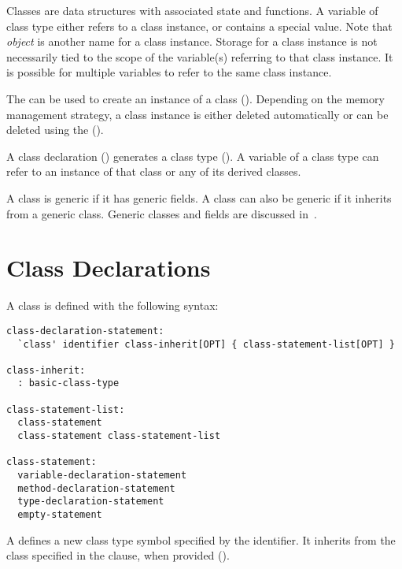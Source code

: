 \label{Classes}


Classes are data structures with associated state and functions.  A
variable of class type either refers to a class instance, or contains a
special  value. Note that \emph{object} is another name for a
class instance.  Storage for a class instance is not necessarily tied to
the scope of the variable(s) referring to that class instance. It is
possible for multiple variables to refer to the same class instance.

The  can be used to create an instance of a class
(). Depending on the memory management strategy, a class
instance is either deleted automatically or can be deleted using the
 ().

A class declaration () generates a class
type ().  A variable of a class type can refer to an
instance of that class or any of its derived classes.

A class is generic if it has generic fields. A class can also
be generic if it inherits from a generic class. Generic classes and fields
are discussed in~.

\section{Class Declarations}
\label{Class_Declarations}

A class is defined with the following syntax:
\begin{syntax}
\begin{verbatim}
class-declaration-statement:
  `class' identifier class-inherit[OPT] { class-statement-list[OPT] }

class-inherit:
  : basic-class-type

class-statement-list:
  class-statement
  class-statement class-statement-list

class-statement:
  variable-declaration-statement
  method-declaration-statement
  type-declaration-statement
  empty-statement
\end{verbatim}
\end{syntax}

A  defines a new class type symbol
specified by the identifier. It inherits from the class specified
in the  clause, when provided ().

